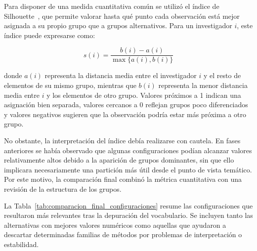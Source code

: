 \documentclass[11pt,spanish,listoffigures,listoftables]{tfgetsinf}
\begin{document}
Para disponer de una medida cuantitativa común se utilizó el índice de Silhouette~\cite{rousseeuw}, que permite valorar hasta qué punto cada observación está mejor asignada a su propio grupo que a grupos alternativos. Para un investigador \(i\), este índice puede expresarse como:

\[
s(i) = \frac{b(i) - a(i)}{\max\{a(i), b(i)\}}
\]

donde \(a(i)\) representa la distancia media entre el investigador \(i\) y el resto de elementos de su mismo grupo, mientras que \(b(i)\) representa la menor distancia media entre \(i\) y los elementos de otro grupo. Valores próximos a 1 indican una asignación bien separada, valores cercanos a 0 reflejan grupos poco diferenciados y valores negativos sugieren que la observación podría estar más próxima a otro grupo.

No obstante, la interpretación del índice debía realizarse con cautela. En fases anteriores se había observado que algunas configuraciones podían alcanzar valores relativamente altos debido a la aparición de grupos dominantes, sin que ello implicara necesariamente una partición más útil desde el punto de vista temático. Por este motivo, la comparación final combinó la métrica cuantitativa con una revisión de la estructura de los grupos.

La Tabla~\ref{tab:comparacion_final_configuraciones} resume las configuraciones que resultaron más relevantes tras la depuración del vocabulario. Se incluyen tanto las alternativas con mejores valores numéricos como aquellas que ayudaron a descartar determinadas familias de métodos por problemas de interpretación o estabilidad.
\end{document}
